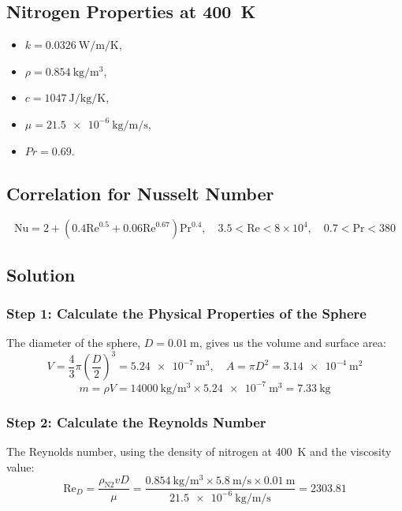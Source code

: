 \documentclass{article}
\begin{document}
\subsection*{Nitrogen Properties at \SI{400}{\kelvin}}
\begin{itemize}
    \item \(k = \SI{0.0326}{\watt\per\meter\per\kelvin}\),
    \item \(\rho = \SI{0.854}{\kilogram\per\meter\cubed}\),
    \item \(c = \SI{1047}{\joule\per\kilogram\per\kelvin}\),
    \item \(\mu = \SI{21.5e-6}{\kilogram\per\meter\per\second}\),
    \item \(Pr = 0.69\).
\end{itemize}

\subsection*{Correlation for Nusselt Number}
\[
\text{Nu} = 2 + \left(0.4 \text{Re}^{0.5} + 0.06 \text{Re}^{0.67}\right) \text{Pr}^{0.4}, \quad 3.5 < \text{Re} < 8 \times 10^4, \quad 0.7 < \text{Pr} < 380
\]

\subsection*{Solution}

\subsubsection*{Step 1: Calculate the Physical Properties of the Sphere}
The diameter of the sphere, \(D = \SI{0.01}{\meter}\), gives us the volume and surface area:
\[
V = \frac{4}{3}\pi \left(\frac{D}{2}\right)^3 = \SI{5.24e-7}{\meter\cubed}, \quad A = \pi D^2 = \SI{3.14e-4}{\meter\squared}
\]
\[
m = \rho V = \SI{14000}{\kilogram\per\meter\cubed} \times \SI{5.24e-7}{\meter\cubed} = \SI{7.33}{\kilogram}
\]

\subsubsection*{Step 2: Calculate the Reynolds Number}
The Reynolds number, using the density of nitrogen at \SI{400}{\kelvin} and the viscosity value:
\[
\text{Re}_D = \frac{\rho_{\text{N2}} v D}{\mu} = \frac{\SI{0.854}{\kilogram\per\meter\cubed} \times \SI{5.8}{\meter\per\second} \times \SI{0.01}{\meter}}{\SI{21.5e-6}{\kilogram\per\meter\per\second}} = 2303.81
\]
\end{document}
